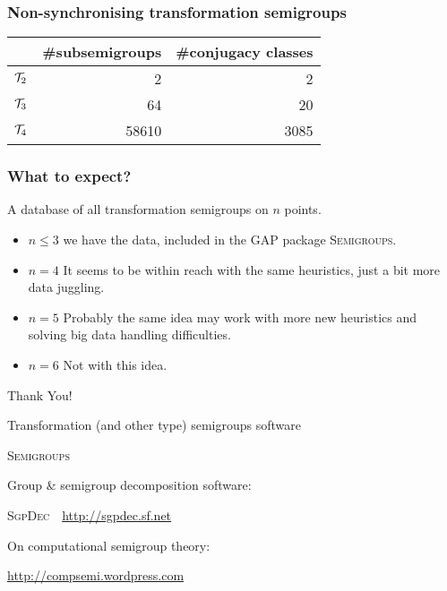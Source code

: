 \documentclass{beamer}
\newcommand{\cT}{{\cal T}}
\newcommand{\SgpDec}{\textsc{SgpDec}}
\begin{document}
\begin{frame}
\frametitle{Non-synchronising transformation semigroups}
\begin{tabular}{c|r|r}
& \#subsemigroups & \#conjugacy classes\\
\hline
$\cT_2$ & 2 & 2\\
$\cT_3$ & 64 & 20\\
$\cT_4$ & 58610 & 3085
\end{tabular}
\end{frame}

\begin{frame}\frametitle{What to expect?}
A database of all transformation semigroups on $n$ points.
\begin{itemize}
\item $n\leq 3$ we have the data, included in the \textsc{GAP} package \textsc{Semigroups}.
\item $n=4$ It seems to be within reach with the same heuristics, just a bit more data juggling.
\item $n=5$ Probably the same idea may work with more new heuristics and solving big data handling difficulties.
\item $n=6$ Not with this idea.
\end{itemize}
\end{frame}


\begin{frame}
\begin{center}\Huge Thank You!\end{center}
\normalsize

Transformation (and other type) semigroups software
\begin{center}
\textsc{Semigroups}
\end{center}

Group \& semigroup decomposition software:
\begin{center}
\SgpDec\ \ \url{http://sgpdec.sf.net}
\end{center}

On computational semigroup theory:
\begin{center}
\url{http://compsemi.wordpress.com}
\end{center}


\end{frame}
\end{document}
